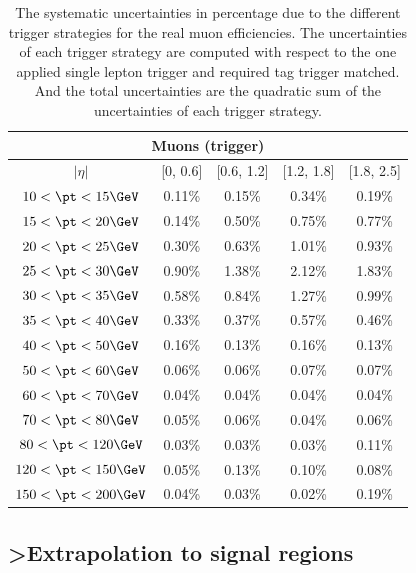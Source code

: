 \begin{table}[htbp]
\begin{center}
\begin{tabular}{ccccc}
\hline
\hline
\multicolumn{5}{c}{Muons (trigger)}\\
\hline
$|\eta|$ & [0, 0.6] & [0.6, 1.2] & [1.2, 1.8] & [1.8, 2.5]\\
\hline
$10<\pt<15 \GeV$ & 0.11\% & 0.15\% & 0.34\% & 0.19\%\\
$15<\pt<20 \GeV$ & 0.14\% & 0.50\% & 0.75\% & 0.77\%\\
$20<\pt<25 \GeV$ & 0.30\% & 0.63\% & 1.01\% & 0.93\%\\
$25<\pt<30 \GeV$ & 0.90\% & 1.38\% & 2.12\% & 1.83\%\\
$30<\pt<35 \GeV$ & 0.58\% & 0.84\% & 1.27\% & 0.99\%\\
$35<\pt<40 \GeV$ & 0.33\% & 0.37\% & 0.57\% & 0.46\%\\
$40<\pt<50 \GeV$ & 0.16\% & 0.13\% & 0.16\% & 0.13\%\\
$50<\pt<60 \GeV$ & 0.06\% & 0.06\% & 0.07\% & 0.07\%\\
$60<\pt<70 \GeV$ & 0.04\% & 0.04\% & 0.04\% & 0.04\%\\
$70<\pt<80 \GeV$ & 0.05\% & 0.06\% & 0.04\% & 0.06\%\\
$80<\pt<120 \GeV$ & 0.03\% & 0.03\% & 0.03\% & 0.11\%\\
$120<\pt<150 \GeV$ & 0.05\% & 0.13\% & 0.10\% & 0.08\%\\
$150<\pt<200 \GeV$ & 0.04\% & 0.03\% & 0.02\% & 0.19\%\\
\hline
\hline
\end{tabular}
\caption{The systematic uncertainties in percentage due to the different trigger strategies for the real muon efficiencies.
The uncertainties of each trigger strategy are computed with respect to the one applied single lepton trigger and required tag trigger matched.
And the total uncertainties are the quadratic sum of the uncertainties of each trigger strategy.
}
\label{tab:RLE_trigger_syst_muon}
\end{center}
\end{table}

\subsection{>Extrapolation to signal regions}
\label{subsubsec:RLE_extrapolation_to_signal_region}

